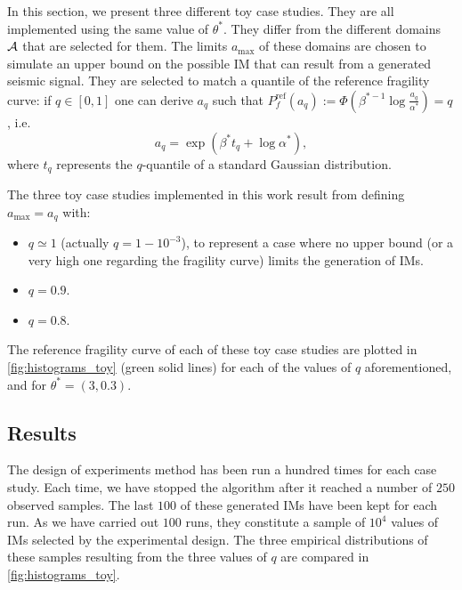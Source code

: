     In this section, we present three different toy case studies. They are all implemented using the same value of $\theta^\ast$. 
    They differ from the different domains $\mathcal{A}$ that are selected for them.
    The limits $a_{\text{max}}$ of these domains are chosen to simulate an upper bound 
    on the possible IM that can result from a generated seismic signal.
    They are selected to match a quantile of the reference fragility curve: if $q\in[0,1]$ one can derive $a_q$ such that $P^{\text{ref}}_f(a_q):=\Phi\left(\beta^{\ast -1}\log\frac{a_q}{\alpha^{\ast}}\right)=q$, i.e.
        \begin{equation}
            a_q = \exp\left( \beta^\ast t_q+\log\alpha^\ast \right),
        \end{equation}
    where $t_q$ represents the $q$-quantile of a standard Gaussian distribution.
    
    The three toy case studies implemented in this work result from defining $a_{\text{max}}=a_q$ with:
    \begin{itemize}
        \item $q\simeq1$ (actually $q=1-10^{-3}$), to represent a case where no upper bound (or a very high one regarding the fragility curve) limits the generation of IMs. %
        \item $q=0.9$.
        \item $q=0.8$.
    \end{itemize}
    The reference fragility curve of each of these toy case studies are plotted in  \cref{fig:histograms_toy} (green solid lines) for each of the values of $q$ aforementioned, and for $\theta^\ast=(3,0.3)$. 
    
    
    
    
    
    \subsection{Results}
    
    The design of experiments method has been run a hundred times for each case study. Each time, we have stopped the algorithm after it reached a number of $250$ observed samples.
    The last $100$ of these generated IMs have been kept for each run. As we have carried out $100$ runs, they constitute a sample of $10^4$ values of IMs selected by the experimental design.
    The three empirical distributions of these samples resulting from the three values of $q$ are compared in  \cref{fig:histograms_toy}.
    
